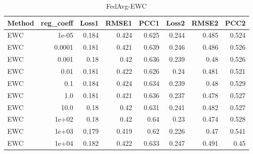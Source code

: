 \begin{table}
\caption{FedAvg-EWC}
\begin{tabular}{lrrrrrrr}
\toprule
Method & reg_coeff & Loss1 & RMSE1 & PCC1 & Loss2 & RMSE2 & PCC2 \\
\midrule
EWC & 1e-05 & 0.184 & 0.424 & 0.625 & 0.244 & 0.485 & 0.524 \\
EWC & 0.0001 & 0.181 & 0.421 & 0.639 & 0.246 & 0.486 & 0.526 \\
EWC & 0.001 & 0.18 & 0.42 & 0.636 & 0.239 & 0.48 & 0.526 \\
EWC & 0.01 & 0.181 & 0.422 & 0.626 & 0.24 & 0.481 & 0.521 \\
EWC & 0.1 & 0.184 & 0.424 & 0.634 & 0.239 & 0.48 & 0.529 \\
EWC & 1.0 & 0.181 & 0.421 & 0.636 & 0.237 & 0.478 & 0.527 \\
EWC & 10.0 & 0.18 & 0.42 & 0.631 & 0.241 & 0.482 & 0.527 \\
EWC & 1e+02 & 0.18 & 0.42 & 0.64 & 0.23 & 0.474 & 0.528 \\
EWC & 1e+03 & 0.179 & 0.419 & 0.62 & 0.226 & 0.47 & 0.541 \\
EWC & 1e+04 & 0.182 & 0.422 & 0.633 & 0.247 & 0.491 & 0.45 \\
\bottomrule
\end{tabular}
\end{table}

